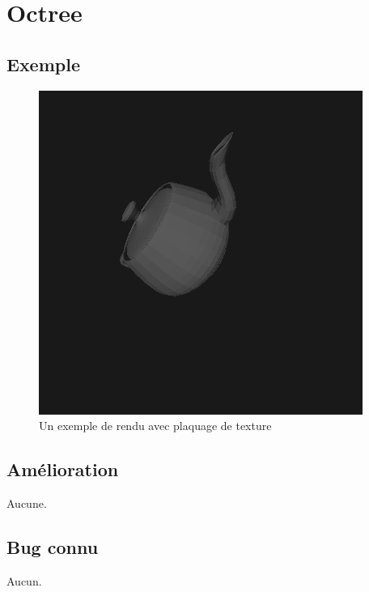 \section{Octree}

\subsection{Exemple}
\begin{figure}
  \includegraphics[width=\textwidth, keepaspectratio=true]{../../diary/11.png}
  \caption{Un exemple de rendu avec plaquage de texture\label{fig:texture}}
\end{figure}

\subsection{Amélioration}
Aucune.

\subsection{Bug connu}
Aucun.

